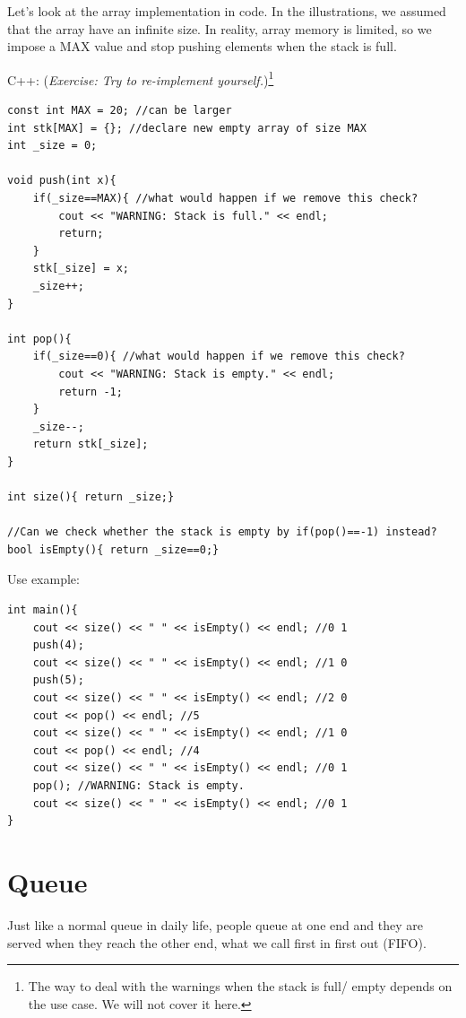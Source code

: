 Let's look at the array implementation in code. In the illustrations, we assumed that the array have an infinite size. In reality, array memory is limited, so we impose a MAX value and stop pushing elements when the stack is full.


C++: (\textit{Exercise: Try to re-implement yourself.})\footnote{The way to deal with the warnings when the stack is full/ empty depends on the use case. We will not cover it here.}
\begin{lstlisting}
const int MAX = 20; //can be larger
int stk[MAX] = {}; //declare new empty array of size MAX
int _size = 0;

void push(int x){
    if(_size==MAX){ //what would happen if we remove this check?
        cout << "WARNING: Stack is full." << endl;
        return;
    }
    stk[_size] = x;
    _size++;
}

int pop(){
    if(_size==0){ //what would happen if we remove this check?
        cout << "WARNING: Stack is empty." << endl;
        return -1;
    }
    _size--;
    return stk[_size];
}

int size(){ return _size;}

//Can we check whether the stack is empty by if(pop()==-1) instead?
bool isEmpty(){ return _size==0;}
\end{lstlisting}

Use example:
\begin{lstlisting}
int main(){
    cout << size() << " " << isEmpty() << endl; //0 1
    push(4);
    cout << size() << " " << isEmpty() << endl; //1 0
    push(5);
    cout << size() << " " << isEmpty() << endl; //2 0
    cout << pop() << endl; //5
    cout << size() << " " << isEmpty() << endl; //1 0
    cout << pop() << endl; //4
    cout << size() << " " << isEmpty() << endl; //0 1
    pop(); //WARNING: Stack is empty.
    cout << size() << " " << isEmpty() << endl; //0 1
} 
\end{lstlisting}
\section{Queue}
Just like a normal queue in daily life, people queue at one end and they are served when they reach the other end, what we call first in first out (FIFO).

